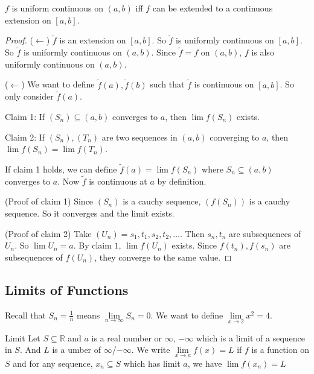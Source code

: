 \documentclass{report}
\begin{document}
\begin{theorem}{19.5}
    $f$ is uniform continuous on $(a, b)$ iff $f$ can be extended to a continuous extension on $[a, b]$.
\end{theorem}
    \begin{proof}
        ($\leftarrow $) $\tilde{f}$ is an extension on $[a, b]$. So $\tilde{f}$ is uniformly continuous on $[a, b]$. So $\tilde{f}$ is uniformly continuous on $(a, b)$. Since $\tilde{f} = f$ on $(a, b)$, $f$ is also uniformly continuous on $(a, b)$.

        ($\leftarrow $) We want to define $\tilde{f}(a), \tilde{f}(b)$ such that $\tilde{f}$ is continuous on $[a, b]$. So only consider $\tilde{f}(a)$. 

        Claim 1: If $(S_{n}) \subseteq (a, b)$ converges to $a$, then $\lim f(S_{n})$ exists.

        Claim 2: If $(S_{n}), (T_{n})$ are two sequences in $(a, b)$ converging to $a$, then $\lim f(S_{n}) = \lim f(T_{n})$.

        If claim 1 holds, we can define $\tilde{f}(a) = \lim f(S_{n})$ where $S_{n} \subseteq (a, b)$ converges to $a$. Now $\tilde{f}$ is continuous at $a$ by definition.

        (Proof of claim 1) Since $(S_{n})$ is a cauchy sequence, $(f(S_{n}))$ is a cauchy sequence. So it converges and the limit exists.

        (Proof of claim 2) Take $(U_{n}) = s_{1}, t_{1}, s_{2}, t_{2}, \ldots$. Then $s_{n}, t_{n}$ are subsequences of $U_{n}$. So $\lim U_{n} = a$. By claim $1$, $\lim f(U_{n})$ exists. Since $f(t_{n}), f(s_{n})$ are subsequences of $f(U_{n})$, they converge to the same value.
    \end{proof}

\begin{topic}
    \section{Limits of Functions}
\end{topic}

Recall that $S_{n} = \frac{1}{n}$ means $\lim\limits_{n \to \infty}S_{n} = 0$. We want to define $\lim\limits_{x \to 2} x^{2} = 4$.

\begin{definition}{Limit}
    Let $S \subseteq \mathbb{R}$ and $a$ is a real number or $\infty$, $-\infty$ which is a limit of a sequence in $S$. And $L$ is a umber of $\infty$/$-\infty$. We write $\lim\limits_{x \to a} f(x) = L$ if $f$ is a function on $S$ and for any sequence, $x_{n} \subseteq S$ which has limit $a$, we have $\lim f(x_{n}) = L$
\end{definition}
\end{document}
